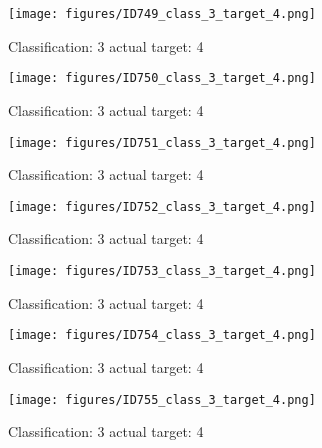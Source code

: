 \begin{figure}[h!]
\begin{center}
\texttt{[image: figures/ID749\_class\_3\_target\_4.png]}
\end{center}
\caption{ Classification: 3 actual target: 4}
\label{fig:ID749_class_3_target_4}
\end{figure}
\begin{figure}[h!]
\begin{center}
\texttt{[image: figures/ID750\_class\_3\_target\_4.png]}
\end{center}
\caption{ Classification: 3 actual target: 4}
\label{fig:ID750_class_3_target_4}
\end{figure}
\begin{figure}[h!]
\begin{center}
\texttt{[image: figures/ID751\_class\_3\_target\_4.png]}
\end{center}
\caption{ Classification: 3 actual target: 4}
\label{fig:ID751_class_3_target_4}
\end{figure}
\begin{figure}[h!]
\begin{center}
\texttt{[image: figures/ID752\_class\_3\_target\_4.png]}
\end{center}
\caption{ Classification: 3 actual target: 4}
\label{fig:ID752_class_3_target_4}
\end{figure}
\begin{figure}[h!]
\begin{center}
\texttt{[image: figures/ID753\_class\_3\_target\_4.png]}
\end{center}
\caption{ Classification: 3 actual target: 4}
\label{fig:ID753_class_3_target_4}
\end{figure}
\begin{figure}[h!]
\begin{center}
\texttt{[image: figures/ID754\_class\_3\_target\_4.png]}
\end{center}
\caption{ Classification: 3 actual target: 4}
\label{fig:ID754_class_3_target_4}
\end{figure}
\begin{figure}[h!]
\begin{center}
\texttt{[image: figures/ID755\_class\_3\_target\_4.png]}
\end{center}
\caption{ Classification: 3 actual target: 4}
\label{fig:ID755_class_3_target_4}
\end{figure}
